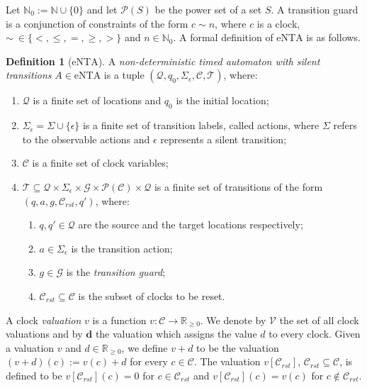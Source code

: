 \documentclass[11pt]{amsart}
\theoremstyle{definition}
\newtheorem{definition}[theorem]{Definition}
\newcommand{\ntaeps}{\mathrm{eNTA}}
\newcommand{\Actions}{\Sigma}
\newcommand{\eActions}{\Sigma_{\epsilon}}
\newcommand{\Locs}{\mathcal{Q}}
\newcommand{\Clocks}{\mathcal{C}}
\newcommand{\ResetClocks}{\mathcal{C}_{rst}}
\newcommand{\clk}{c}
\newcommand{\Trans}{\mathcal{T}}
\newcommand{\Guards}{\mathcal{G}}
\newcommand{\ClockVal}{\mathcal{V}}
\newcommand{\Naturals}{\mathbb{N}}
\newcommand{\ZNaturals}{\mathbb{N}_0}
\newcommand{\PReals}{\mathbb{R}_{\geq 0}}
\newcommand{\powerset}[1]{\mathcal P \left({#1}\right) }
\begin{document}
Let $\ZNaturals := \Naturals \cup \{0\}$ and let $\powerset{S}$ be the power set of a set $S$.
A transition guard is a conjunction of constraints of the form $\clk \sim n$, where $\clk$ is a clock, $\sim \ \in \{<,\leq, =,\geq, >\}$ and $n \in \ZNaturals$.
A formal definition of $\ntaeps$ is as follows.
\begin{definition}[$\ntaeps$]
\label{def:ntaeps}
A \emph{non-deterministic timed automaton with silent transitions} $A \in \ntaeps$ is a tuple $(\Locs, q_0, \eActions, \Clocks,
\Trans)$, where:
\begin{enumerate}
\item $\Locs$ is a finite set of locations and $q_0$ is the initial location;
\item $\eActions = \Sigma \cup \{\epsilon\}$ is a finite set of transition labels, called actions, where $\Actions$ refers to the observable actions and $\epsilon$ represents a silent transition;
\item $\Clocks$ is a finite set of clock variables;
\item $\Trans \subseteq \Locs \times \eActions \times \Guards \times \powerset{\Clocks} \times \Locs$ is a finite set of transitions of the form $(q, a, g, \ResetClocks, q')$, where:
\begin{enumerate}
\item $q,q' \in \Locs$ are the source and the target locations respectively;
\item $a \in \eActions$ is the transition action;
\item $g \in  \Guards$ is the \emph{transition guard};
\item $\ResetClocks \subseteq \Clocks$ is the subset of clocks to be reset.
\end{enumerate}
\end{enumerate}
\end{definition}

A clock \emph{valuation} $v$ is a function $v:\Clocks \to \PReals$. 
We denote by $\ClockVal$ the set of all clock valuations and by
$\textbf{d}$ the valuation which assigns the value $d$ to every clock.
Given a valuation $v$ and $d \in \PReals$, we define $v+d$ to be the valuation $(v+d)(\clk) := v(\clk)+d$ for every $ \clk \in \Clocks$.
The valuation $v[\ResetClocks]$, $\ResetClocks \subseteq \Clocks$, is defined to be $v[\ResetClocks](c) = 0$ for $c \in \ResetClocks$ and $v[\ResetClocks](c) = v(c)$ for $c \notin \ResetClocks$.
\end{document}
